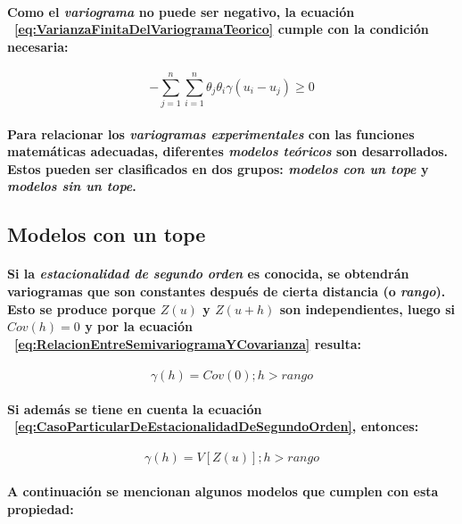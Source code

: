 \paragraph{
Como el \emph{variograma} no puede ser negativo, la ecuación ~\ref{eq:VarianzaFinitaDelVariogramaTeorico} cumple con la condición necesaria:
}
\begin{equation}
- \sum_{j=1}^n \sum_{i=1}^n \theta_j \theta_i \gamma(u_i - u_j) \geq 0
\label{eq:CondicionParaElVariograma}
\end{equation}
\paragraph{
Para relacionar los \emph{variogramas experimentales} con las funciones matemáticas adecuadas, diferentes \emph{modelos teóricos} son desarrollados. Estos pueden ser clasificados en dos grupos: \emph{modelos con un tope} y \emph{modelos sin un tope}.
}


\subsection{Modelos con un tope}
\paragraph*{
Si la \emph{estacionalidad de segundo orden} es conocida\footnotemark[16], se obtendrán variogramas que son constantes después de cierta distancia (o \emph{rango}). Esto se produce porque $Z(u)$ y $Z(u+h)$ son independientes, luego si $Cov(h) = 0$ y por la ecuación ~\ref{eq:RelacionEntreSemivariogramaYCovarianza} resulta:
}
\begin{equation}
\gamma(h) = Cov(0) ; h > rango
\end{equation}
\paragraph{
Si además se tiene en cuenta la ecuación ~\ref{eq:CasoParticularDeEstacionalidadDeSegundoOrden}, entonces:
}
\begin{equation}
\gamma(h) = V[Z(u)] ; h > rango
\end{equation}
\paragraph*{
A continuación se mencionan algunos modelos que cumplen con esta propiedad\footnotemark[17]:
}

